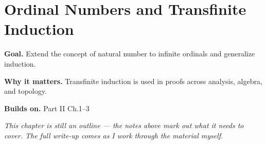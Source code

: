 \chapter{Ordinal Numbers and Transfinite Induction}
\label{ch:02-set-theory-04}

\begin{chapterintro}
\textbf{Goal.} Extend the concept of natural number to infinite ordinals and generalize induction.

\textbf{Why it matters.} Transfinite induction is used in proofs across analysis, algebra, and topology.

\textbf{Builds on.} Part II Ch.1–3
\end{chapterintro}

\textit{This chapter is still an outline --- the notes above mark out what it needs to cover. The full write-up comes as I work through the material myself.}
